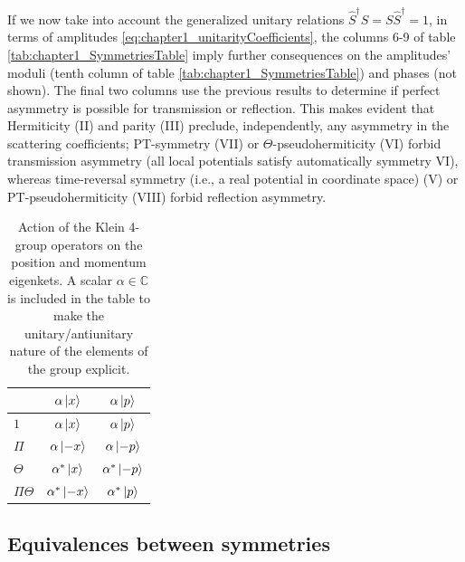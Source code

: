 If we now take into account the generalized unitary relations $\widehat{S}^\dagger S=S\widehat{S}^\dagger=1$, in terms of amplitudes \eqref{eq:chapter1_unitarityCoefficients}, the columns 6-9 of table \ref{tab:chapter1_SymmetriesTable} imply further consequences on the amplitudes' moduli (tenth column of table \ref{tab:chapter1_SymmetriesTable}) and phases (not shown). The final two columns use the previous results to determine if perfect asymmetry is possible for transmission or reflection.
This makes evident that Hermiticity (II) and parity (III) preclude, independently, any asymmetry in the scattering coefficients;
PT-symmetry (VII) or  $\Theta$-pseudohermiticity
(VI) forbid transmission asymmetry (all local potentials  satisfy automatically
symmetry VI),  whereas time-reversal symmetry (i.e., a real potential in coordinate space)
(V) or  PT-pseudohermiticity (VIII) forbid reflection asymmetry.


\begin{table}
  \caption{Action of the Klein 4-group operators on the position and momentum eigenkets. A scalar $\alpha \in \mathbb{C}$ is included in the table to make the unitary/antiunitary nature of the elements of the group explicit.}
  \label{tab:chapter1_KleinGroupOnPosAndMomentBases}
  \center
  \begin{tabular}{lcc}
    \hline\hline
    & $\alpha \ket{x}$ & $\alpha \ket{p}$\\
    \hline
    $1$ & $\alpha \ket{x}$ & $\alpha \ket{p}$\\ %
    $\Pi$  & $\alpha \ket{-x}$ & $\alpha \ket{-p}$\\ %
    $\Theta$ & $\alpha^* \ket{x}$ & $\alpha^* \ket{-p}$\\ %
    $\Pi\Theta$ & $\alpha^* \ket{-x}$ & $\alpha^* \ket{p}$\\ %
    \hline\hline
  \end{tabular}
\end{table}




\subsection{Equivalences between symmetries}


